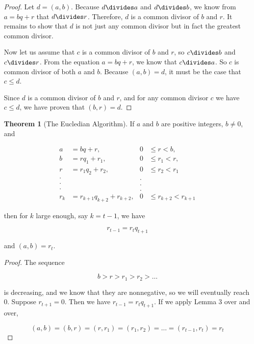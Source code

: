 \documentclass{article}
\theoremstyle{definition} %
\newtheorem{theorem}{Theorem}[section] %
\theoremstyle{definition}
\theoremstyle{definition}
\theoremstyle{definition}
\begin{document}
  \begin{proof}
    Let $d = (a, b)$. Because $d \divides a$ and $d \divides b$, we know from $a = bq + r$ that $d \divides r$.
    Therefore, $d$ is a common divisor of $b$ and $r$. It remains to show that $d$ is not just any common
    divisor but in fact the greatest common divisor.
    
    Now let us assume that $c$ is a common divisor of $b$ and $r$, so $c \divides b$ and $c \divides r$.
    From the equation $a = bq + r$, we know that $c \divides a$. So $c$ is common divisor of both
    $a$ and $b$. Because $(a, b) = d$, it must be the case that $c \leq d$.
    
    Since $d$ is a common divisor of $b$ and $r$, and for any common divisor $c$ we have $c \leq d$,
    we have proven that $(b, r) = d$.
  \end{proof}
  
  \begin{theorem}[The Eucledian Algorithm]
    If $a$ and $b$ are positive integers, $b \ne 0$, and
    
    \begin{align*}
      a &= bq + r,         &0 &\leq r < b, \\
      b &= rq_1 + r_1, &0 &\leq r_1 < r, \\
      r &= r_1q_2 + r_2, &0 &\leq r_2 < r_1 \\
      \cdot & &. \\
      \cdot & &. \\
      \cdot & &. \\
      r_k &= r_{k+1}q_{k+2} + r_{k+2}, &0 &\leq r_{k+2} < r_{k+1}
    \end{align*}
    
    then for $k$ large enough, say $k = t - 1$, we have
    
    \begin{equation*}
      r_{t - 1} = r_tq_{t+1}
    \end{equation*}
    
    and $(a, b) = r_t$.
  \end{theorem}
  
  \begin{proof}
    The sequence
    
    \begin{equation*}
      b > r > r_1 > r_2 > \dots
    \end{equation*}
    
    is decreasing, and we know that they are nonnegative, so we will eventually reach 0. Suppose $r_{t+1} = 0$.
    Then we have $r_{t - 1} = r_tq_{t+1}$. If we apply Lemma 3 over and over,
    
    \begin{equation*}
      (a, b) = (b, r) = (r, r_1) = (r_1, r_2) = \dots = (r_{t-1}, r_t) = r_t
    \end{equation*}
  \end{proof}
  
\end{document}
